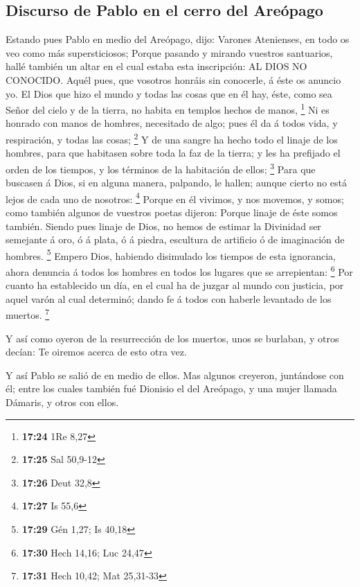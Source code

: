\hypertarget{discurso-de-pablo-en-el-cerro-del-areuxf3pago}{%
\subsection{Discurso de Pablo en el cerro del
Areópago}\label{discurso-de-pablo-en-el-cerro-del-areuxf3pago}}

 Estando pues Pablo en medio del Areópago, dijo: Varones
Atenienses, en todo os veo como más supersticiosos;  Porque
pasando y mirando vuestros santuarios, hallé también un altar en el cual
estaba esta inscripción: AL DIOS NO CONOCIDO. Aquél pues, que vosotros
honráis sin conocerle, á éste os anuncio yo.  El Dios que
hizo el mundo y todas las cosas que en él hay, éste, como sea Señor del
cielo y de la tierra, no habita en templos hechos de manos, \footnote{\textbf{17:24}
  1Re 8,27}  Ni es honrado con manos de hombres, necesitado
de algo; pues él da á todos vida, y respiración, y todas las cosas;
\footnote{\textbf{17:25} Sal 50,9-12}  Y de una sangre ha
hecho todo el linaje de los hombres, para que habitasen sobre toda la
faz de la tierra; y les ha prefijado el orden de los tiempos, y los
términos de la habitación de ellos; \footnote{\textbf{17:26} Deut 32,8}
 Para que buscasen á Dios, si en alguna manera, palpando,
le hallen; aunque cierto no está lejos de cada uno de nosotros:
\footnote{\textbf{17:27} Is 55,6}  Porque en él vivimos, y
nos movemos, y somos; como también algunos de vuestros poetas dijeron:
Porque linaje de éste somos también.  Siendo pues linaje de
Dios, no hemos de estimar la Divinidad ser semejante á oro, ó á plata, ó
á piedra, escultura de artificio ó de imaginación de hombres.
\footnote{\textbf{17:29} Gén 1,27; Is 40,18}  Empero Dios,
habiendo disimulado los tiempos de esta ignorancia, ahora denuncia á
todos los hombres en todos los lugares que se arrepientan: \footnote{\textbf{17:30}
  Hech 14,16; Luc 24,47}  Por cuanto ha establecido un día,
en el cual ha de juzgar al mundo con justicia, por aquel varón al cual
determinó; dando fe á todos con haberle levantado de los muertos.
\footnote{\textbf{17:31} Hech 10,42; Mat 25,31-33}

 Y así como oyeron de la resurrección de los muertos, unos
se burlaban, y otros decían: Te oiremos acerca de esto otra vez.

 Y así Pablo se salió de en medio de ellos. 
Mas algunos creyeron, juntándose con él; entre los cuales también fué
Dionisio el del Areópago, y una mujer llamada Dámaris, y otros con
ellos.

